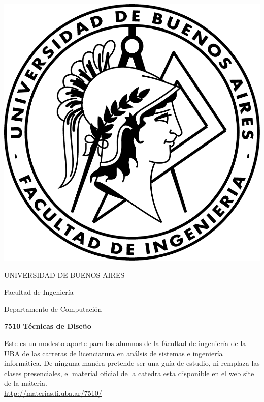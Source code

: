 \documentclass[12pt]{book}
\begin{document}
\thispagestyle{empty}

\begin {center}

\includegraphics[scale=.4]{Logo-fiuba_big.png}

\medskip
UNIVERSIDAD DE BUENOS AIRES

Facultad de Ingenier\'ia

Departamento de Computaci\'on


\vspace{3cm}


\textbf{\large 7510 T\'ecnicas de Diseño}

\vspace{2cm}


Este es un modesto aporte para los alumnos de la f\'acultad de ingenier\'ia  de la UBA de las carreras de licenciatura en an\'alsis de sistemas e ingenier\'ia inform\'atica.
De ninguna man\'era pretende ser una gu\'ia de estudio, ni remplaza las clases presenciales, el material oficial de la catedra esta disponible en el web site de la m\'ateria.
\\
\url{http://materias.fi.uba.ar/7510/}

\end {center}


\vspace{2.5cm}
\end{document}

